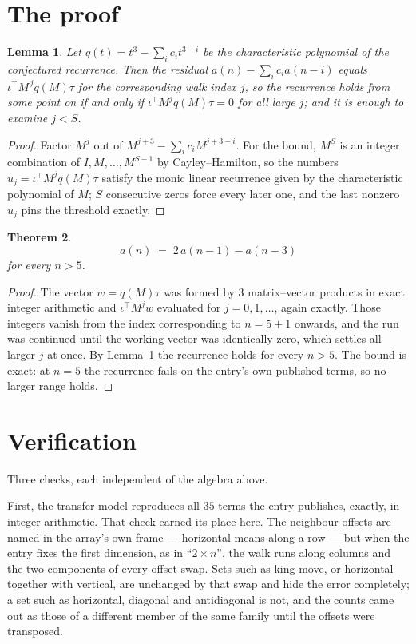 \documentclass[11pt,a4paper]{article}
\theoremstyle{plain}
\newtheorem{theorem}{Theorem}
\newtheorem{lemma}[theorem]{Lemma}
\theoremstyle{definition}
\begin{document}
\section{The proof}

\begin{lemma}\label{lem:crit}
Let $q(t)=t^{3}-\sum_i c_it^{3-i}$ be the characteristic polynomial of the
conjectured recurrence. Then the residual $a(n)-\sum_ic_ia(n-i)$ equals
$\iota^{\!\top}M^{\,j}q(M)\tau$ for the corresponding walk index $j$, so the
recurrence holds from some point on if and only if $\iota^{\!\top}M^{j}q(M)\tau=0$ for all
large $j$; and it is enough to examine $j<S$.
\end{lemma}

\begin{proof}
Factor $M^{j}$ out of $M^{j+3}-\sum_ic_iM^{j+3-i}$. For the bound, $M^{S}$
is an integer combination of $I,M,\dots,M^{S-1}$ by Cayley--Hamilton, so the numbers
$u_j=\iota^{\!\top}M^{j}q(M)\tau$ satisfy the monic linear recurrence given by the
characteristic polynomial of $M$; $S$ consecutive zeros force every later one, and the last
nonzero $u_j$ pins the threshold exactly.
\end{proof}

\begin{theorem}
\[
a(n)\;=\;2\,a(n-1) - a(n-3)
\]
for every $n>5$.
\end{theorem}

\begin{proof}
The vector $w=q(M)\tau$ was formed by $3$ matrix--vector products in exact integer
arithmetic and $\iota^{\!\top}M^{j}w$ evaluated for $j=0,1,\dots$, again exactly. Those
integers vanish from the index corresponding to $n=5+1$ onwards, and the run was
continued until the working vector was identically zero, which settles all larger $j$ at once.
By Lemma~\ref{lem:crit} the recurrence holds for every $n>5$. The bound is exact: at $n=5$ the recurrence fails on the entry's own published terms, so no larger range holds.
\end{proof}

\section{Verification}

Three checks, each independent of the algebra above.

First, the transfer model reproduces all $35$ terms the entry publishes, exactly, in
integer arithmetic. That check earned its place here. The neighbour offsets are named in the
array's own frame --- horizontal means along a row --- but when the entry fixes the first
dimension, as in ``$2\times n$'', the walk runs along columns and the two components of every
offset swap. Sets such as king-move, or horizontal together with vertical, are unchanged by
that swap and hide the error completely; a set such as horizontal, diagonal and antidiagonal
is not, and the counts came out as those of a different member of the same family until the
offsets were transposed.
\end{document}
